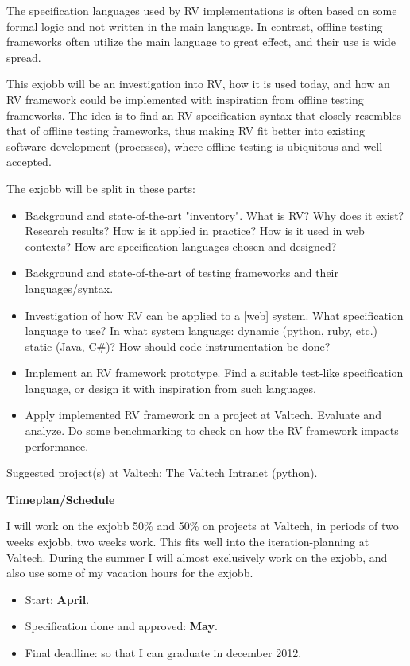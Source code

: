 \documentclass[a4paper,11pt]{kth-mag}
\begin{document}
The specification languages used by RV implementations is often based
on some formal logic and not written in the main language. In contrast,
offline testing frameworks often utilize the main language to great effect,
and their use is wide spread.

This exjobb will be an investigation into RV, how it is used today, and how an
RV framework could be implemented with inspiration from offline testing
frameworks. The idea is to find an RV specification syntax that closely
resembles that of offline testing frameworks, thus making RV fit better into
existing software development (processes), where offline testing is ubiquitous
and well accepted.

The exjobb will be split in these parts:

\begin{itemize}
	\item Background and state-of-the-art "inventory". What is RV? Why does it
        exist? Research results? How is it applied in practice? How is it used
        in web contexts? How are specification languages chosen and designed?
	\item Background and state-of-the-art of testing frameworks and their
        languages/syntax.
	\item Investigation of how RV can be applied to a [web] system. What
        specification language to use? In what system language: dynamic
        (python, ruby, etc.) static (Java, C\#)? How should code
        instrumentation be done?
	\item Implement an RV framework prototype. Find a suitable test-like
        specification language, or design it with inspiration from such
        languages.
	\item Apply implemented RV framework on a project at Valtech. Evaluate and
        analyze. Do some benchmarking to check on how the RV framework impacts
        performance.
\end{itemize}

Suggested project(s) at Valtech: The Valtech Intranet (python).

\textbf{Timeplan/Schedule}

I will work on the exjobb 50\% and 50\% on projects at Valtech, in periods of
two weeks exjobb, two weeks work. This fits well into the iteration-planning at
Valtech. During the summer I will almost exclusively work on the exjobb, and also
use some of my vacation hours for the exjobb.

\begin{itemize}
	\item Start: \textbf{April}.
    \item Specification done and approved: \textbf{May}.
	\item Final deadline: so that I can graduate in december 2012.
\end{itemize}
\end{document}

